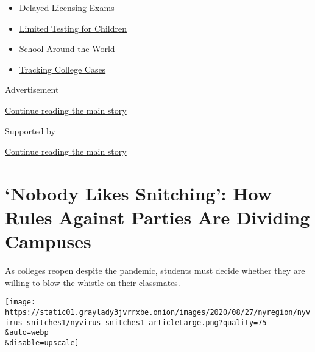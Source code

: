\begin{itemize}
\tightlist
\item
  \href{https://www.nytimes3xbfgragh.onion/2020/09/04/us/bar-exam-coronavirus.html?name=styln-coronavirus-schools-reopening\&region=TOP_BANNER\&block=storyline_menu_recirc\&action=click\&pgtype=Article\&impression_id=3bd893d0-f27b-11ea-9a21-295489aede86\&variant=undefined}{Delayed
  Licensing Exams}
\item
  \href{https://www.nytimes3xbfgragh.onion/2020/09/08/upshot/children-testing-shortfalls-virus.html?name=styln-coronavirus-schools-reopening\&region=TOP_BANNER\&block=storyline_menu_recirc\&action=click\&pgtype=Article\&impression_id=3bd893d1-f27b-11ea-9a21-295489aede86\&variant=undefined}{Limited
  Testing for Children}
\item
  \href{https://www.nytimes3xbfgragh.onion/2020/09/01/world/schools-reopen-globe-students.html?name=styln-coronavirus-schools-reopening\&region=TOP_BANNER\&block=storyline_menu_recirc\&action=click\&pgtype=Article\&impression_id=3bd893d2-f27b-11ea-9a21-295489aede86\&variant=undefined}{School
  Around the World}
\item
  \href{https://www.nytimes3xbfgragh.onion/interactive/2020/us/covid-college-cases-tracker.html?name=styln-coronavirus-schools-reopening\&region=TOP_BANNER\&block=storyline_menu_recirc\&action=click\&pgtype=Article\&impression_id=3bd893d3-f27b-11ea-9a21-295489aede86\&variant=undefined}{Tracking
  College Cases}
\end{itemize}

Advertisement

\protect\hyperlink{after-top}{Continue reading the main story}

Supported by

\protect\hyperlink{after-sponsor}{Continue reading the main story}

\hypertarget{nobody-likes-snitching-how-rules-against-parties-are-dividing-campuses}{%
\section{`Nobody Likes Snitching': How Rules Against Parties Are
Dividing
Campuses}\label{nobody-likes-snitching-how-rules-against-parties-are-dividing-campuses}}

As colleges reopen despite the pandemic, students must decide whether
they are willing to blow the whistle on their classmates.

\texttt{[image: https://static01.graylady3jvrrxbe.onion/images/2020/08/27/nyregion/nyvirus-snitches1/nyvirus-snitches1-articleLarge.png?quality=75\\\&auto=webp\\\&disable=upscale]}


